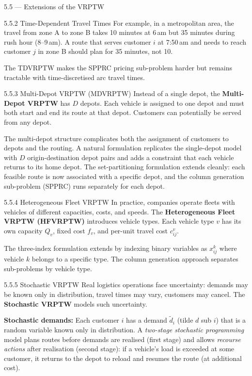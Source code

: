 \documentclass[aspectratio=169,10pt]{beamer}
\begin{document}
\begin{frame}[allowframebreaks]{5.5 --- Extensions of the VRPTW}
\begin{block}{5.5.2 Time-Dependent Travel Times}
\medskip
For example, in a metropolitan area, the travel from zone A to zone B takes 10
minutes at 6\,am but 35 minutes during rush hour (8--9\,am).  A route that serves
customer $i$ at 7:50\,am and needs to reach customer $j$ in zone B should plan for
35 minutes, not 10.

The TDVRPTW makes the SPPRC pricing sub-problem harder but remains tractable with
time-discretised arc travel times.
\end{block}

\framebreak

\begin{block}{5.5.3 Multi-Depot VRPTW (MDVRPTW)}
Instead of a single depot, the \textbf{Multi-Depot VRPTW} has $D$ depots.  Each
vehicle is assigned to one depot and must both start and end its route at that
depot.  Customers can potentially be served from any depot.

\medskip
The multi-depot structure complicates both the assignment of customers to depots
and the routing.  A natural formulation replicates the single-depot model with
$D$ origin-destination depot pairs and adds a constraint that each vehicle returns
to its home depot.  The set-partitioning formulation extends cleanly: each feasible
route is now associated with a specific depot, and the column generation
sub-problem (SPPRC) runs separately for each depot.
\end{block}

\begin{block}{5.5.4 Heterogeneous Fleet VRPTW}
In practice, companies operate fleets with vehicles of different capacities,
costs, and speeds.  The \textbf{Heterogeneous Fleet VRPTW (HFVRPTW)} introduces
vehicle types.  Each vehicle type $v$ has its own capacity $Q_v$, fixed cost
$f_v$, and per-unit travel cost $c_{ij}^v$.

\medskip
The three-index formulation extends by indexing binary variables as $x_{ij}^k$
where vehicle $k$ belongs to a specific type.  The column generation approach
separates sub-problems by vehicle type.
\end{block}

\framebreak

\begin{block}{5.5.5 Stochastic VRPTW}
Real logistics operations face uncertainty: demands may be known only in
distribution, travel times may vary, customers may cancel.  The
\textbf{Stochastic VRPTW} models such uncertainty.

\medskip
\textbf{Stochastic demands:} Each customer $i$ has a demand $\tilde{d}_i$ (tilde
$d$ sub $i$) that is a random variable known only in distribution.  A
\emph{two-stage stochastic programming} model plans routes before demands are
realised (first stage) and allows \emph{recourse actions} after realisation
(second stage): if a vehicle's load is exceeded at some customer, it returns to
the depot to reload and resumes the route (at additional cost).


\end{block}
\end{frame}
\end{document}
